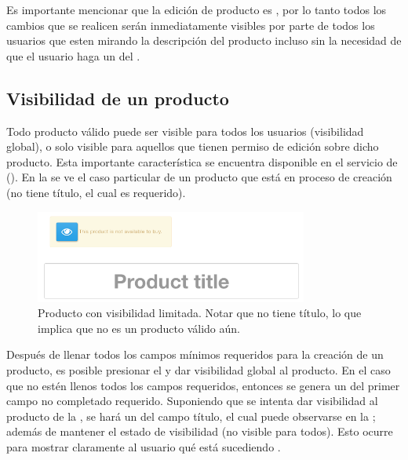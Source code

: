 		Es importante mencionar que la edición de producto es \reactive, por lo tanto todos los cambios que se realicen serán inmediatamente visibles por parte de todos los usuarios que esten mirando la descripción del producto incluso sin la necesidad de que el usuario haga un  del \websiteINT.


	\subsection{Visibilidad de un producto}
	
		Todo producto válido puede ser visible para todos los usuarios (visibilidad global), o solo visible para aquellos que tienen permiso de edición sobre dicho producto. Esta importante característica se encuentra disponible en el servicio de \shopifyNAME(). En la  se ve el caso particular de un producto que está en proceso de creación (no tiene título, el cual es requerido).

		\begin{figure}[H]
			\centering
			\includegraphics[width=0.8\textwidth]{figuras/productos/details/write/visibility_new_product.png}

			\caption{Producto con visibilidad limitada. Notar que no tiene título, lo que implica que no es un producto válido aún.}
			\label{figure:solution:product:visibility:new}
		\end{figure}

		Después de llenar todos los campos mínimos requeridos para la creación de un producto, es posible presionar el \linkINT \youCanMakeItVisibleLABEL y dar visibilidad global al producto. En el caso que no estén llenos todos los campos requeridos, entonces se genera un \autoFocoINT del primer campo no completado requerido. Suponiendo que se intenta dar visibilidad al producto de la , se hará un \autoFocoINT del campo título, el cual puede observarse en la ; además de mantener el estado de visibilidad (no visible para todos). Esto ocurre para mostrar claramente al usuario qué está sucediendo \cite{online_google_ui_pattern_error, online_goodgui_org}.


